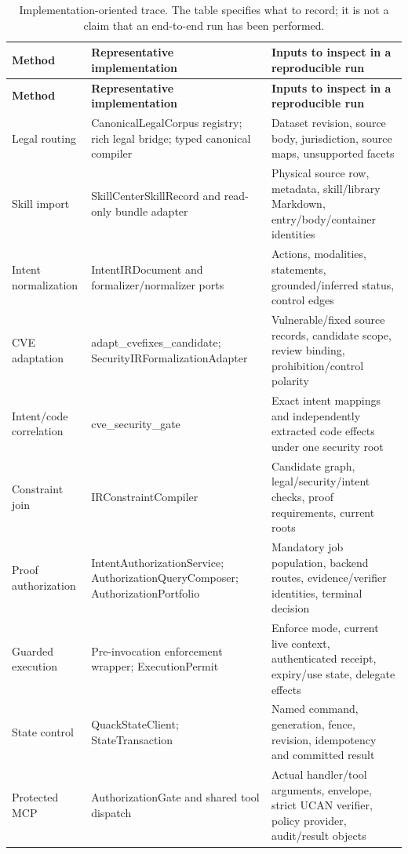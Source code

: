\begingroup
\renewcommand{\thetable}{D1}
\begin{longtable}{@{}>{\raggedright\arraybackslash}p{.24\linewidth} >{\raggedright\arraybackslash}p{.32\linewidth} >{\raggedright\arraybackslash}p{.38\linewidth}@{}}
\caption{Implementation-oriented trace. The table specifies what to record; it is not a claim that an end-to-end run has been performed.}\label{tab:D1}\\
\toprule
\textbf{Method} & \textbf{Representative implementation} & \textbf{Inputs to inspect in a reproducible run} \\
\midrule
\endfirsthead
\textbf{Method} & \textbf{Representative implementation} & \textbf{Inputs to inspect in a reproducible run} \\
\midrule
\endhead
\bottomrule
\endlastfoot
Legal routing & CanonicalLegalCorpus registry; rich legal bridge; typed canonical compiler & Dataset revision, source body, jurisdiction, source maps, unsupported facets \\[3pt]
Skill import & SkillCenterSkillRecord and read-only bundle adapter & Physical source row, metadata, skill/library Markdown, entry/body/container identities \\[3pt]
Intent normalization & IntentIRDocument and formalizer/normalizer ports & Actions, modalities, statements, grounded/inferred status, control edges \\[3pt]
CVE adaptation & adapt\_\allowbreak{}cvefixes\_\allowbreak{}candidate; SecurityIRFormalizationAdapter & Vulnerable/fixed source records, candidate scope, review binding, prohibition/control polarity \\[3pt]
Intent/code correlation & cve\_\allowbreak{}security\_\allowbreak{}gate & Exact intent mappings and independently extracted code effects under one security root \\[3pt]
Constraint join & IRConstraintCompiler & Candidate graph, legal/security/intent checks, proof requirements, current roots \\[3pt]
Proof authorization & IntentAuthorizationService; AuthorizationQueryComposer; AuthorizationPortfolio & Mandatory job population, backend routes, evidence/verifier identities, terminal decision \\[3pt]
Guarded execution & Pre-invocation enforcement wrapper; ExecutionPermit & Enforce mode, current live context, authenticated receipt, expiry/use state, delegate effects \\[3pt]
State control & QuackStateClient; StateTransaction & Named command, generation, fence, revision, idempotency and committed result \\[3pt]
Protected MCP & AuthorizationGate and shared tool dispatch & Actual handler/tool arguments, envelope, strict UCAN verifier, policy provider, audit/result objects \\[3pt]
\end{longtable}
\endgroup
